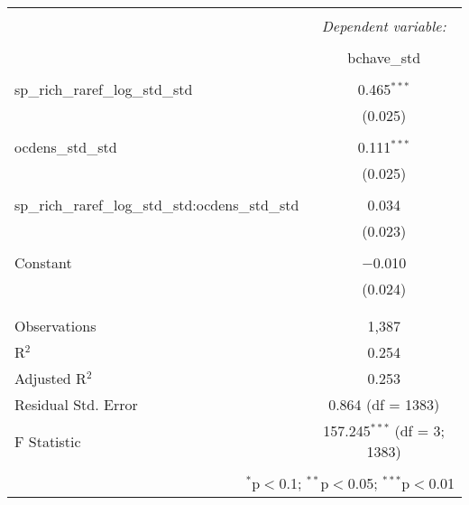 
\begin{table}[!htbp] \centering 
  \caption{} 
  \label{} 
\begin{tabular}{@{\extracolsep{5pt}}lc} 
\\[-1.8ex]\hline 
\hline \\[-1.8ex] 
 & \multicolumn{1}{c}{\textit{Dependent variable:}} \\ 
\cline{2-2} 
\\[-1.8ex] & bchave\_std \\ 
\hline \\[-1.8ex] 
 sp\_rich\_raref\_log\_std\_std & 0.465$^{***}$ \\ 
  & (0.025) \\ 
  & \\ 
 ocdens\_std\_std & 0.111$^{***}$ \\ 
  & (0.025) \\ 
  & \\ 
 sp\_rich\_raref\_log\_std\_std:ocdens\_std\_std & 0.034 \\ 
  & (0.023) \\ 
  & \\ 
 Constant & $-$0.010 \\ 
  & (0.024) \\ 
  & \\ 
\hline \\[-1.8ex] 
Observations & 1,387 \\ 
R$^{2}$ & 0.254 \\ 
Adjusted R$^{2}$ & 0.253 \\ 
Residual Std. Error & 0.864 (df = 1383) \\ 
F Statistic & 157.245$^{***}$ (df = 3; 1383) \\ 
\hline 
\hline \\[-1.8ex] 
\multicolumn{2}{r}{$^{*}$p$<$0.1; $^{**}$p$<$0.05; $^{***}$p$<$0.01} \\ 
\end{tabular} 
\end{table} 
